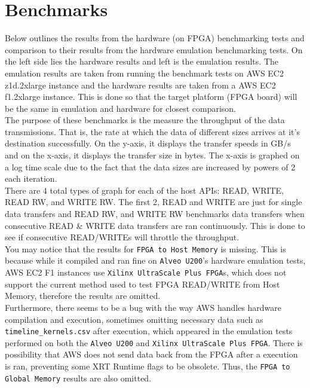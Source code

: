 \section{Benchmarks}

Below outlines the results from the hardware (on FPGA) benchmarking tests and comparison to their results from the hardware emulation benchmarking tests. On the left side lies the hardware results and left is the emulation results. The emulation results are taken from running the benchmark tests on AWS EC2 z1d.2xlarge instance and the hardware results are taken from a AWS EC2 f1.2xlarge instance. This is done so that the target platform (FPGA board) will be the same in emulation and hardware for closest comparison.\\

The purpose of these benchmarks is the measure the throughput of the data transmissions. That is, the rate at which the data of different sizes arrives at it's destination successfully. On the y-axis, it displays the transfer speeds in GB/s and on the x-axis, it displays the transfer size in bytes. The x-axis is graphed on a log time scale due to the fact that the data sizes are increased by powers of 2 each iteration. \\

There are 4 total types of graph for each of the host APIs: READ, WRITE, READ RW, and WRITE RW. The first 2, READ and WRITE are just for single data transfers and READ RW, and WRITE RW benchmarks data transfers when consecutive READ \& WRITE data transfers are ran continuously. This is done to see if consecutive READ/WRITEs will throttle the throughput. \\

You may notice that the results for \texttt{FPGA to Host Memory} is missing. This is because while it compiled and ran fine on \texttt{Alveo U200}'s hardware emulation tests, AWS EC2 F1 instances use \texttt{Xilinx UltraScale Plus FPGA}s, which does not support the current method used to test FPGA READ/WRITE from Host Memory, therefore the results are omitted. \\

Furthermore, there seems to be a bug with the way AWS handles hardware compilation and execution, sometimes omitting necessary data such as \texttt{timeline\_kernels.csv} after execution, which appeared in the emulation tests performed on both the \texttt{Alveo U200} and \texttt{Xilinx UltraScale Plus FPGA}. There is possibility that AWS does not send data back from the FPGA after a execution is ran, preventing some XRT Runtime flags to be obsolete. Thus, the \texttt{FPGA to Global  Memory} results are also omitted. \\

